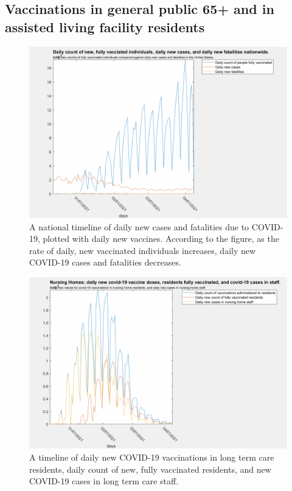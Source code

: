 \documentclass[twoside]{article}
\begin{document}
\begin{multicols}{2}
\subsection{Vaccinations in general public 65+ and in assisted living facility residents}

\begin{figure}[H]
	\includegraphics[width=\linewidth]{images/nationwide_fully_vaccinated.png}
	\caption{A national timeline of daily new cases and fatalities due to COVID-19, plotted with daily new vaccines. According to the figure, as the rate of daily, new vaccinated individuals increases, daily new COVID-19 cases and fatalities decreases.}
	\label{fig:images/nationwide_fully_vaccinatedLabel}
\end{figure}

\begin{figure}[H]
	\includegraphics[width=\linewidth]{images/ltc_fully_vaccinated.png}
	\caption{A timeline of daily new COVID-19 vaccinations in long term care residents, daily count of new, fully vaccinated residents, and new COVID-19 cases in long term care staff.  }
	\label{fig:images/ltc_fully_vaccinatedLabel}
\end{figure}


\end{multicols}
\end{document}
